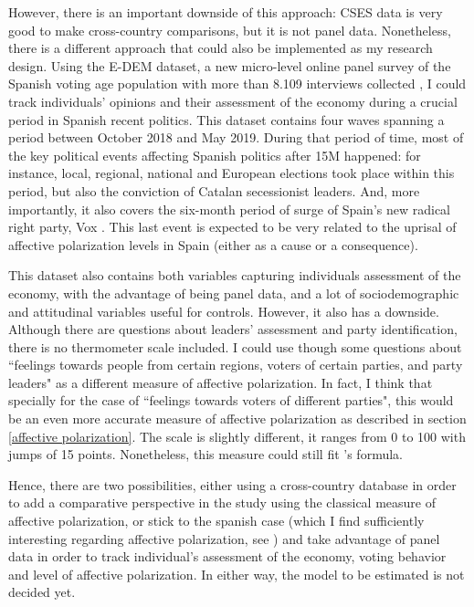\documentclass[a4paper, svgnames]{article}
\begin{document}
However, there is an important downside of this approach: CSES data is very good to make cross-country comparisons, but it is not panel data. Nonetheless, there is a different approach that could also be implemented as my research design. Using the E-DEM dataset, a new micro-level online panel survey of the Spanish voting age population with more than 8.109 interviews collected \citep{Torcal2020}, I could track individuals' opinions and their assessment of the economy during a crucial period in Spanish recent politics. This dataset contains four waves spanning a period between October 2018 and May 2019. During that period of time, most of the key political events affecting Spanish politics after 15M happened: for instance, local, regional, national and European elections took place within this period, but also the conviction of Catalan secessionist leaders. And, more importantly, it also covers the six-month period of surge of Spain's new radical right party, Vox \citep{Torcal2020}. This last event is expected to be very related to the uprisal of affective polarization levels in Spain (either as a cause or a consequence).

This dataset also contains both variables capturing individuals assessment of the economy, with the advantage of being panel data, and a lot of sociodemographic and attitudinal variables useful for controls. However, it also has a downside. Although there are questions about leaders' assessment and party identification, there is no thermometer scale included. I could use though some questions about ``feelings towards people from certain regions, voters of certain parties, and party leaders" as a different measure of affective polarization. In fact, I think that specially for the case of ``feelings towards voters of different parties", this would be an even more accurate measure of affective polarization as described in section \ref{affective polarization}. The scale is slightly different, it ranges from 0 to 100 with jumps of 15 points. Nonetheless, this measure could still fit \cite{Wagner2021}'s formula.

Hence, there are two possibilities, either using a cross-country database in order to add a comparative perspective in the study using the classical measure of affective polarization, or stick to the spanish case (which I find sufficiently interesting regarding affective polarization, see \cite{Orriols2020}) and take advantage of panel data in order to track individual's assessment of the economy, voting behavior and level of affective polarization. In either way, the model to be estimated is not decided yet.
\end{document}
